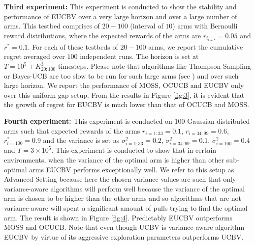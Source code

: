 \textbf{Third experiment:} This experiment is conducted to show the stability and performance of EUCBV over a very large horizon and over a large number of arms. This testbed comprises of $20-100$ (interval of $10$) arms with Bernoulli reward distributions, where the expected rewards of the arms are $r_{i_{{i}\neq {*}}}=0.05$ and $r^{*}=0.1$. For each of these testbeds of $20-100$ arms, we report the cumulative regret averaged over $100$ independent runs. The horizon is set at $T=10^{5} + K_{20:100}^{3}$ timesteps. Please note that algorithms like Thompson Sampling or Bayes-UCB are too slow to be run for such large arms (see \citet{lattimore2015optimally}) and  over such large horizon. We report the performance of MOSS, OCUCB and EUCBV only over this uniform gap setup. From the results in Figure \ref{fig:3}, it is evident that the growth of regret for EUCBV  is much lower than that of OCUCB and MOSS. 


\textbf{Fourth experiment:} This experiment is conducted on 100 Gaussian distributed arms such that expected rewards of the arms $r_{i=1:33}=0.1$, $r_{i=34:99}=0.6$, $r^{*}_{i=100}=0.9$ and the variance is set as $\sigma_{i=1:33}^{2}=0.2$, $\sigma_{i=34:99}^{2}=0.1$,  $\sigma_{i=100}^{2}=0.4$ and $T=3\times 10^5$. This experiment is conducted to show that in certain environments, when the variance of the optimal arm is higher than other sub-optimal arms EUCBV performs exceptionally well. We refer to this setup as Advanced Setting because here the chosen variance values are such that only variance-aware algorithms will perform well because the variance of the optimal arm is chosen to be higher than the other arms and so algorithms that are not variance-aware will spent a significant amount of pulls trying to find the optimal arm. The result is shown in Figure \ref{fig:4}. Predictably EUCBV outperforms MOSS and OCUCB. Note that even though UCBV is variance-aware algorithm EUCBV by virtue of its aggressive exploration parameters outperforms UCBV.




